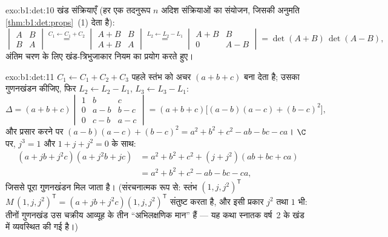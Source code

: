 \begin{solution}{exo:b1:det:10}
खंड संक्रियाएँ (हर एक तदनुरूप $n$ अदिश संक्रियाओं का संयोजन, जिसकी अनुमति
\cref{thm:b1:det:props}~(1) देता है):
\[
\begin{vmatrix} A & B\\ B & A\end{vmatrix}
\overset{C_1 \leftarrow C_1 + C_2}{=}
\begin{vmatrix} A + B & B\\ A + B & A\end{vmatrix}
\overset{L_2 \leftarrow L_2 - L_1}{=}
\begin{vmatrix} A + B & B\\ 0 & A - B\end{vmatrix}
= \det(A+B)\,\det(A-B),
\]
अंतिम चरण के लिए खंड-त्रिभुजाकार नियम का प्रयोग करते हुए।
\end{solution}

\begin{solution}{exo:b1:det:11}
$C_1 \leftarrow C_1 + C_2 + C_3$ पहले स्तंभ को अचर $(a + b + c)$ बना देता
है; उसका गुणनखंडन कीजिए, फिर $L_2 \leftarrow L_2 - L_1$, $L_3 \leftarrow L_3
- L_1$:
\[
\Delta = (a+b+c)\begin{vmatrix}
1 & b & c\\
0 & a - b & b - c\\
0 & c - b & a - c
\end{vmatrix}
= (a+b+c)\bigl[(a-b)(a-c) + (b-c)^2\bigr],
\]
और प्रसार करने पर $(a-b)(a-c) + (b-c)^2 = a^2 + b^2 + c^2 - ab - bc - ca$।
$\C$ पर, $j^3 = 1$ और $1 + j + j^2 = 0$ के साथ:
\begin{align*}
(a + jb + j^2c)(a + j^2b + jc)
&= a^2 + b^2 + c^2 + (j + j^2)(ab + bc + ca)\\
&= a^2 + b^2 + c^2 - ab - bc - ca ,
\end{align*}
जिससे पूरा गुणनखंडन मिल जाता है। (संरचनात्मक रूप से: स्तंभ $(1, j,
j^2)^{\mathsf T}$ $M\,(1, j, j^2)^{\mathsf T} = (a + jb + j^2c)(1, j,
j^2)^{\mathsf T}$ संतुष्ट करता है, और इसी प्रकार $j^2$ तथा $1$ भी: तीनों
गुणनखंड उस चक्रीय आव्यूह के तीन ``अभिलक्षणिक मान'' हैं --- यह कथा स्नातक
वर्ष~2 के खंड में व्यवस्थित की गई है।)
\end{solution}

